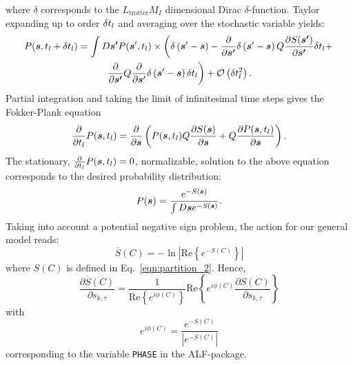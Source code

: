 where $\delta$ corresponds to the $L_\mathrm{trotter} M_I $  dimensional Dirac $\delta$-function.   Taylor expanding  up to order $\delta t_{l}$  and averaging over the stochastic variable yields:
\begin{multline}
P(\boldsymbol{s}, t_{l}  + \delta t_{l} ) = \int D\boldsymbol{s'}  P  (\boldsymbol{s}', t_{l}  )   \times \left(   \delta \left(  \boldsymbol{s}' - \boldsymbol{s}   \right)
-   \frac{\partial  }{\partial    \boldsymbol{s'} } \delta \left(  \boldsymbol{s}' - \boldsymbol{s} \right) Q \frac{\partial S(\boldsymbol{s'}) }{\partial    \boldsymbol{s'} }  \delta t_{l}   +   \right.  \\
   \left. \frac{\partial  }{\partial    \boldsymbol{s'} } Q  \frac{\partial  }{\partial    \boldsymbol{s}' }  \delta \left(  \boldsymbol{s}' - \boldsymbol{s}\right)    \delta t_{l}
\right)  + {\cal O}  \left(  \delta t_{l}^2 \right).
\end{multline}
Partial integration  and taking the limit of infinitesimal time steps   gives the Fokker-Plank equation
\begin{equation}
         \frac{\partial  }{\partial   t_{l}}  P( \boldsymbol{s}, t_{l})  =  \frac{\partial  }{\partial    \boldsymbol{s} }  \left( P( \boldsymbol{s}, t_{l})  Q\frac{\partial S(\boldsymbol{s}) }{\partial     \boldsymbol{s} }   +
        Q  \frac{\partial P(\boldsymbol{s},t_{l}) }{\partial     \boldsymbol{s} }
         \right) .
\end{equation}
The stationary,  $ \frac{\partial  }{\partial   t_{l}}  P( \boldsymbol{s}, t_{l}) =0$,  normalizable,  solution to the above equation corresponds to the desired probability distribution:
\begin{equation}\label{eqn:langevin_solution}
          P(\boldsymbol{s}) =  \frac{ e^{ - S(\boldsymbol{s}) } }   {   \int D \boldsymbol{s}  e^{ - S(\boldsymbol{s}) } }.
\end{equation}
Taking into account a potential negative sign problem, the action   for our general model reads:
\begin{equation}
	\overline{S}(C)   = -  \ln \left|  \text{Re} \left\{  e^{-S(C)} \right\} \right| 
\end{equation}
where  $S(C) $  is defined in Eq.~\ref{eqn:partition_2}.    Hence, 
\begin{equation}
   \frac{ \partial{\overline{S}(C)}} {\partial s_{k,\tau} }    =   \frac{1}{\text{Re} \left\{e^{i \phi(C)}\right\} } \text{Re} \left\{  e^{i\phi(C)}\frac{ \partial S (C)} {\partial s_{k,\tau} }   \right\}
\end{equation}
with
\begin{equation}
	e^{i \phi(C)}  =   \frac{e^{- S(C)}}{| e^{-S(C)}  |}
\end{equation}
corresponding to the variable \texttt{PHASE}  in the ALF-package. 


